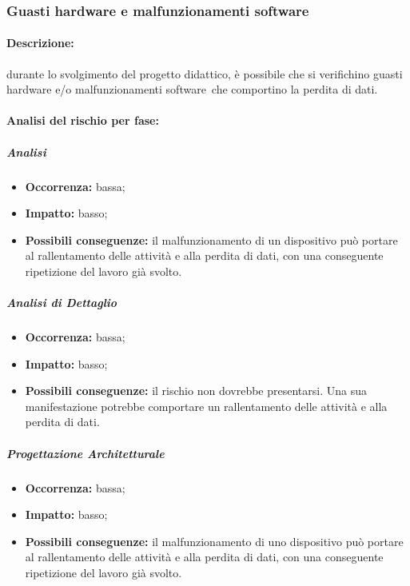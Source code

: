 \documentclass[../PianoProgetto.tex]{subfiles}
\begin{document}
\newpage
	\subsubsection{Guasti hardware e malfunzionamenti software}
	\label{sec:Guasti hardware e malfunzionamenti software}
	
	\paragraph*{Descrizione:} durante lo svolgimento del progetto didattico, è possibile che si verifichino guasti hardware e/o malfunzionamenti software\g\ che comportino la perdita di dati.
	
	\paragraph*{Analisi del rischio per fase:} 

		\subparagraph*{Analisi}
			\begin{itemize}[label={-}]
				\item \textbf{Occorrenza:} bassa;
				\item \textbf{Impatto:} basso;
				\item \textbf{Possibili conseguenze:} il malfunzionamento di un dispositivo può portare al rallentamento delle attività e alla perdita di dati, con una conseguente ripetizione del lavoro già svolto.
			\end{itemize}
			
		\subparagraph*{Analisi di Dettaglio}
			\begin{itemize}[label={-}]
				\item \textbf{Occorrenza:} bassa;
				\item \textbf{Impatto:} basso;
				\item \textbf{Possibili conseguenze:} il rischio non dovrebbe presentarsi. Una sua manifestazione potrebbe comportare un rallentamento delle attività e alla perdita di dati.
			\end{itemize}
			
		\subparagraph*{Progettazione Architetturale}
			\begin{itemize}[label={-}]
				\item \textbf{Occorrenza:} bassa;
				\item \textbf{Impatto:} basso;
				\item \textbf{Possibili conseguenze:} il malfunzionamento di uno dispositivo può portare al rallentamento delle attività e alla perdita di dati, con una conseguente ripetizione del lavoro già svolto.
			\end{itemize}
			
\end{document}
